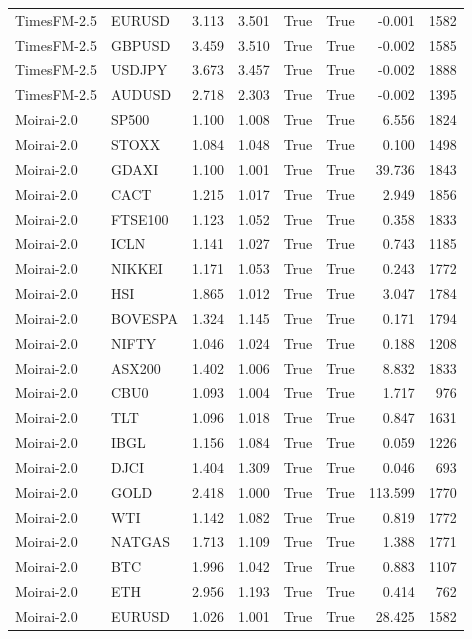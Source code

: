 \begin{table}[H]
\begin{tabular}{llrrrrrr}
TimesFM-2.5 & EURUSD & 3.113 & 3.501 & True & True & -0.001 & 1582 \\
TimesFM-2.5 & GBPUSD & 3.459 & 3.510 & True & True & -0.002 & 1585 \\
TimesFM-2.5 & USDJPY & 3.673 & 3.457 & True & True & -0.002 & 1888 \\
TimesFM-2.5 & AUDUSD & 2.718 & 2.303 & True & True & -0.002 & 1395 \\
Moirai-2.0 & SP500 & 1.100 & 1.008 & True & True & 6.556 & 1824 \\
Moirai-2.0 & STOXX & 1.084 & 1.048 & True & True & 0.100 & 1498 \\
Moirai-2.0 & GDAXI & 1.100 & 1.001 & True & True & 39.736 & 1843 \\
Moirai-2.0 & CACT & 1.215 & 1.017 & True & True & 2.949 & 1856 \\
Moirai-2.0 & FTSE100 & 1.123 & 1.052 & True & True & 0.358 & 1833 \\
Moirai-2.0 & ICLN & 1.141 & 1.027 & True & True & 0.743 & 1185 \\
Moirai-2.0 & NIKKEI & 1.171 & 1.053 & True & True & 0.243 & 1772 \\
Moirai-2.0 & HSI & 1.865 & 1.012 & True & True & 3.047 & 1784 \\
Moirai-2.0 & BOVESPA & 1.324 & 1.145 & True & True & 0.171 & 1794 \\
Moirai-2.0 & NIFTY & 1.046 & 1.024 & True & True & 0.188 & 1208 \\
Moirai-2.0 & ASX200 & 1.402 & 1.006 & True & True & 8.832 & 1833 \\
Moirai-2.0 & CBU0 & 1.093 & 1.004 & True & True & 1.717 & 976 \\
Moirai-2.0 & TLT & 1.096 & 1.018 & True & True & 0.847 & 1631 \\
Moirai-2.0 & IBGL & 1.156 & 1.084 & True & True & 0.059 & 1226 \\
Moirai-2.0 & DJCI & 1.404 & 1.309 & True & True & 0.046 & 693 \\
Moirai-2.0 & GOLD & 2.418 & 1.000 & True & True & 113.599 & 1770 \\
Moirai-2.0 & WTI & 1.142 & 1.082 & True & True & 0.819 & 1772 \\
Moirai-2.0 & NATGAS & 1.713 & 1.109 & True & True & 1.388 & 1771 \\
Moirai-2.0 & BTC & 1.996 & 1.042 & True & True & 0.883 & 1107 \\
Moirai-2.0 & ETH & 2.956 & 1.193 & True & True & 0.414 & 762 \\
Moirai-2.0 & EURUSD & 1.026 & 1.001 & True & True & 28.425 & 1582 \\

\end{tabular}
\end{table}
